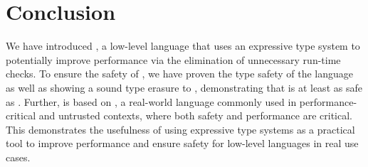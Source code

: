 \chapter{Conclusion}
\label{chp:conclusion}

We have introduced \name, a low-level language that uses an expressive type system to potentially improve performance via the elimination of unnecessary run-time checks.
To ensure the safety of \name, we have proven the type safety of the \name language as well as showing a sound type erasure to \wasm, demonstrating that \name is at least as safe as \wasm.
Further, \name is based on \wasm, a real-world language commonly used in performance-critical and untrusted contexts, where both safety and performance are critical.
This demonstrates the usefulness of using expressive type systems as a practical tool to improve performance and ensure safety for low-level languages in real use cases.
